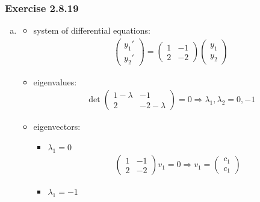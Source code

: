 \documentclass[12pt, letterpaper]{scrartcl}
\begin{document}
\subsubsection*{Exercise 2.8.19}
\begin{enumerate}[(a)]
    \item 
    \begin{itemize}
    \item system of differential equations:
    \begin{align*}
        \left(\begin{array}{c}
        y_1' \\
        y_2' 
        \end{array}\right)=
        \left(\begin{array}{cc}
        1 & -1 \\
        2 & -2 
        \end{array}\right)
        \left(\begin{array}{c}
        y_1 \\
        y_2 
        \end{array}\right)
    \end{align*}
    \item eigenvalues:
    \begin{align*}
        \det 
        \left(\begin{array}{cc}
        1-\lambda & -1 \\
        2 & -2-\lambda 
        \end{array}\right)=0
        \Longrightarrow
        \lambda_{1},\lambda_{2}=0, -1
    \end{align*}
    \item eigenvectors:
        \begin{itemize}
        \item $\lambda_{1}=0$
        \begin{align*}
            \left(\begin{array}{cc}
            1 & -1 \\
            2 & -2 
            \end{array}\right)
            v_1=0
            \Longrightarrow
            v_1=\left(\begin{array}{c}
            c_1 \\
            c_1 
            \end{array}\right)
        \end{align*}
        \item $\lambda_{1}=-1$
        \begin{align*}

\end{align*}
\end{itemize}
\end{itemize}
\end{enumerate}
\end{document}
